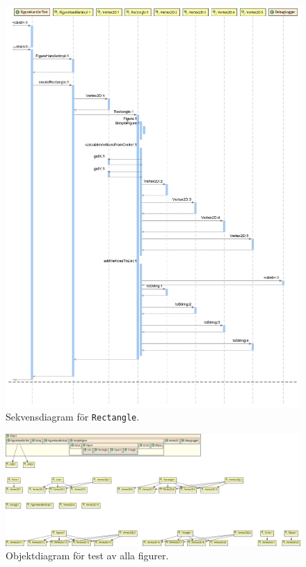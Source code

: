 \begin{figure}[ht]
\centering
\includegraphics[width=\linewidth]{diagram/figureHandlerTest_Rectangle_Sequence-Diagram.png}
\caption{Sekvensdiagram för \texttt{Rectangle}.}
\label{fig:sekv-rect}
\end{figure}

\begin{figure}
\centering
\includegraphics[width=\linewidth]{diagram/figureHandlerTest_All_Object-Diagram.png}
\caption{Objektdiagram för test av alla figurer.}
\label{fig:obj-all}
\end{figure}

